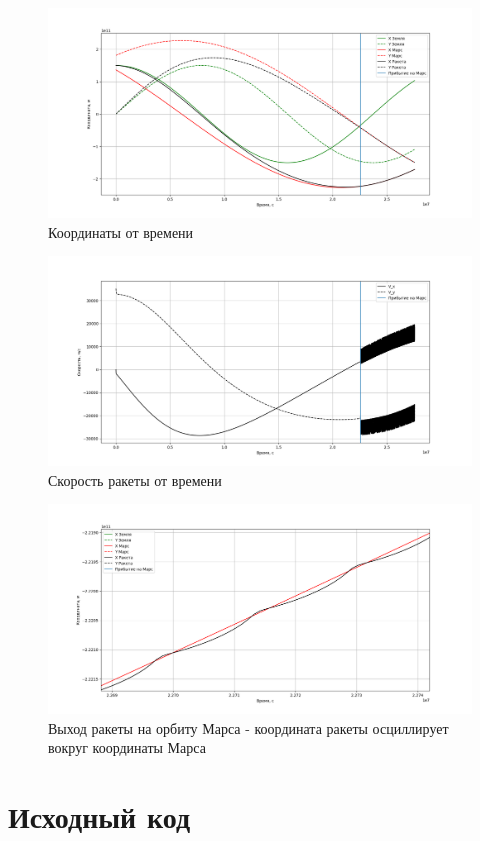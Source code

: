\begin{figure}
	\center
	\includegraphics[width=.99\linewidth]{imgs_9/crds.png}
	\caption{Координаты от времени}
	\label{fig:crds}
\end{figure}

\begin{figure}
	\center
	\includegraphics[width=.99\linewidth]{imgs_9/vel.png}
	\caption{Скорость ракеты от времени}
	\label{fig:vel}
\end{figure}

\begin{figure}
	\center
	\includegraphics[width=.99\linewidth]{imgs_9/orb.png}
	\caption{Выход ракеты на орбиту Марса - координата ракеты осциллирует вокруг координаты Марса}
	\label{fig:orb}
\end{figure}

\newpage
\section{Исходный код}



